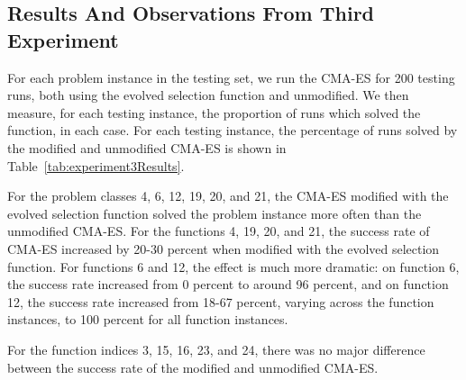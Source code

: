 \documentclass[sigconf]{acmart}
\begin{document}
\subsection{Results And Observations From Third Experiment}
\label{thirdExperimentResults}

For each problem instance in the testing set, we run the CMA-ES for 200 testing runs, both using the evolved selection function and unmodified. We then measure, for each testing instance, the proportion of runs which solved the function, in each case. For each testing instance, the percentage of runs solved by the modified and unmodified CMA-ES is shown in Table~\ref{tab:experiment3Results}.

For the problem classes 4, 6, 12, 19, 20, and 21, the CMA-ES modified with the evolved selection function solved the problem instance more often than the unmodified CMA-ES. For the functions 4, 19, 20, and 21, the success rate of CMA-ES increased by 20-30 percent when modified with the evolved selection function. For functions 6 and 12, the effect is much more dramatic: on function 6, the success rate increased from 0 percent to around 96 percent, and on function 12, the success rate increased from 18-67 percent, varying across the function instances, to 100 percent for all function instances.

For the function indices 3, 15, 16, 23, and 24, there was no major difference between the success rate of the modified and unmodified CMA-ES.
\end{document}
